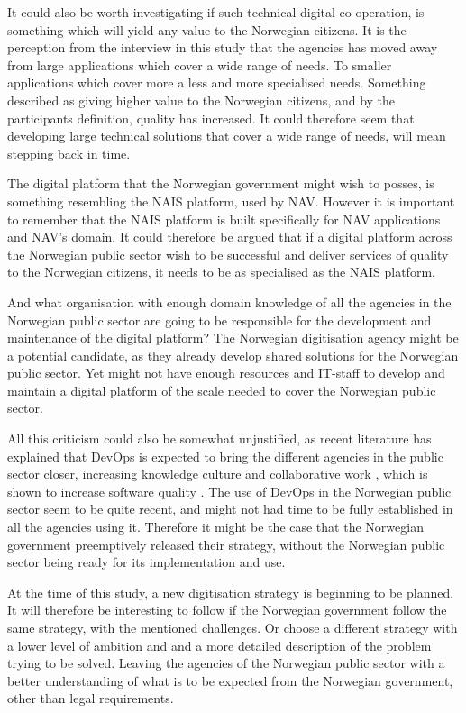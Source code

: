 It could also be worth investigating if such technical digital co-operation, is something which will yield any value to the Norwegian citizens. It is the perception from the interview in this study that the agencies has moved away from large applications which cover a wide range of needs. To smaller applications which cover more a less and more specialised needs. Something described as giving higher value to the Norwegian citizens, and by the participants definition, quality has increased. It could therefore seem that developing large technical solutions that cover a wide range of needs, will mean stepping back in time.

The digital platform that the Norwegian government might wish to posses, is something resembling the NAIS platform, used by NAV. However it is important to remember that the NAIS platform is built specifically for NAV applications and NAV's domain. It could therefore be argued that if a digital platform across the Norwegian public sector wish to be successful and deliver services of quality to the Norwegian citizens, it needs to be as specialised as the NAIS platform. 

And what organisation with enough domain knowledge of all the agencies in the Norwegian public sector are going to be responsible for the development and maintenance of the digital platform? The Norwegian digitisation agency might be a potential candidate, as they already develop shared solutions for the Norwegian public sector. Yet might not have enough resources and IT-staff to develop and maintain a digital platform of the scale needed to cover the Norwegian public sector. 

All this criticism could also be somewhat unjustified, as recent literature has explained that DevOps is expected to bring the different agencies in the public sector closer, increasing knowledge culture and collaborative work \cite{mm_2021}, which is shown to increase software quality \cite{smm_2018}. The use of DevOps in the Norwegian public sector seem to be quite recent, and might not had time to be fully established in all the agencies using it. Therefore it might be the case that the Norwegian government preemptively released their strategy, without the Norwegian public sector being ready for its implementation and use.

At the time of this study, a new digitisation strategy is beginning to be planned. It will therefore be interesting to follow if the Norwegian government follow the same strategy, with the mentioned challenges. Or choose a different strategy with a lower level of ambition and and a more detailed description of the problem trying to be solved. Leaving the agencies of the Norwegian public sector with a better understanding of what is to be expected from the Norwegian government, other than legal requirements.

